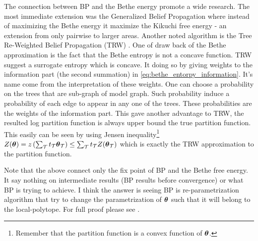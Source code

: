 The connection between BP and the Bethe energy promote a wide research.
The most immediate extension was the Generalized Belief Propagation \cite{yedidia2000generalized} where instead of maximizing the Bethe energy it maximize the Kikuchi free energy - an extension from only pairwise to larger areas.
Another noted algorithm is the Tree Re-Weighted Belief Propagation (TRW) \cite{wainwright2003tree}.  One of draw back of the Bethe approximation is the fact that the Bethe entropy is not a concave function. TRW suggest a surrogate entropy  which is concave. It doing so by giving weights to the information part (the second summation) in \eqref{eq:bethe_entorpy_information}.  It's name come from the interpretation of these weights.
One can choose a probability on the trees that are sub-graph of model graph.
Such probability induce a probability of each edge to appear in any one of the trees.
These probabilities are the weights of the information part.
This gave another advantage to TRW,  the resulted log partition function is always upper bound the true partition function. 
This easily can be seen by using Jensen inequality\footnote{Remember that the partition function is a convex function of $\boldsymbol{\theta}$.} $Z(\boldsymbol{\theta}) = z\left(\sum_{\mathcal{T}} t_{\mathcal{T}}\boldsymbol{\theta}_{\mathcal{T}}\right) \leq \sum_{\mathcal{T}} t_{\mathcal{T}} Z(\boldsymbol{\theta}_{\mathcal{T}})$ which is exactly the TRW approximation to the partition function.



Note that the above connect only the fix point of BP and the Bethe free energy.
It say nothing on intermediate results (BP results before convergence) or what BP is trying to achieve.
I think the answer is seeing BP is re-parametrization algorithm that try to change the parametrization of $\boldsymbol{\theta}$ such that it will belong to the local-polytope.
For full proof please see \cite{wainwright2002stochastic}.


